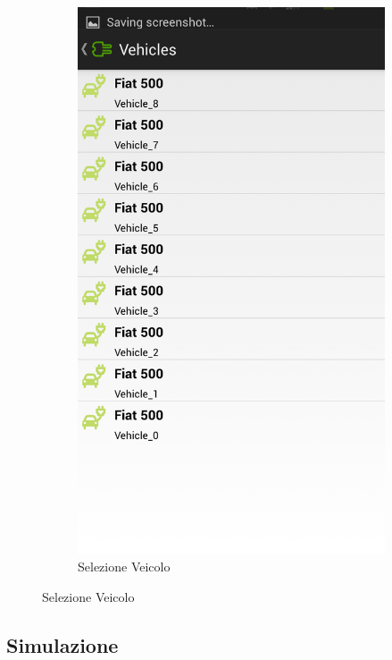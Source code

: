 \begin{figure}
\begin{subfigure}{0.45\textwidth}
		\includegraphics[width=\textwidth]{assets/mobile-app-select-veh.png}
		\caption{Selezione Veicolo}
		\label{fig:select-veh}
    \end{subfigure}
\end{figure}

\subsection{Simulazione}

